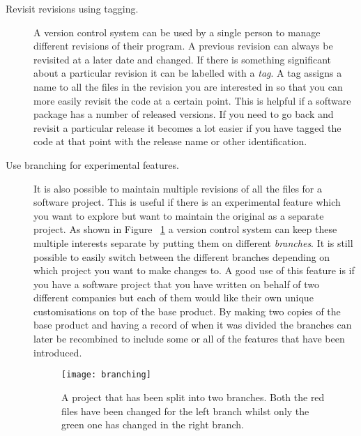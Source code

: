 \begin{description}

  \item [Revisit revisions using tagging.]
  A version control system can be used by a single person to manage different revisions of their program. 
  A previous revision can always be revisited at a later date and changed. 
  If there is something significant about a particular revision it can be labelled with a \emph{tag}. 
  A tag assigns a name to all the files in the revision you are interested in so that you can more easily revisit the code at a certain point.  
  This is helpful if a software package has a number of released versions.  
  If you need to go back and revisit a particular release it becomes a lot easier if you have tagged the code at that point with the release name or other identification.
   
   

  
  \item [Use branching for experimental features.] 
  It is also possible to maintain multiple revisions of all the files for a software project. 
  This is useful if there is an experimental feature which you want to explore but want to maintain the original as a separate project. 
  As shown in Figure ~\ref{fig:bgBranches} a version control system can keep these multiple interests separate by putting them on different \emph{branches}. 
  It is still possible to easily switch between the different branches depending on which project you want to make changes to.  
  A good use of this feature is if you have a software project that you have written on behalf of two different companies but each of them would like their own unique customisations on top of the base product.  
  By making two copies of the base product and having a record of when it was divided the branches can later be recombined to include some or all of the features that have been introduced.  

  \begin{figure}[!t]
   \begin{center}
    \texttt{[image: branching]}
   \end{center}
   \caption{A project that has been split into two branches. Both the red files have been changed for the left branch whilst only the green one has changed in the right branch.}
   \label{fig:bgBranches}
  \end{figure}


\end{description}
